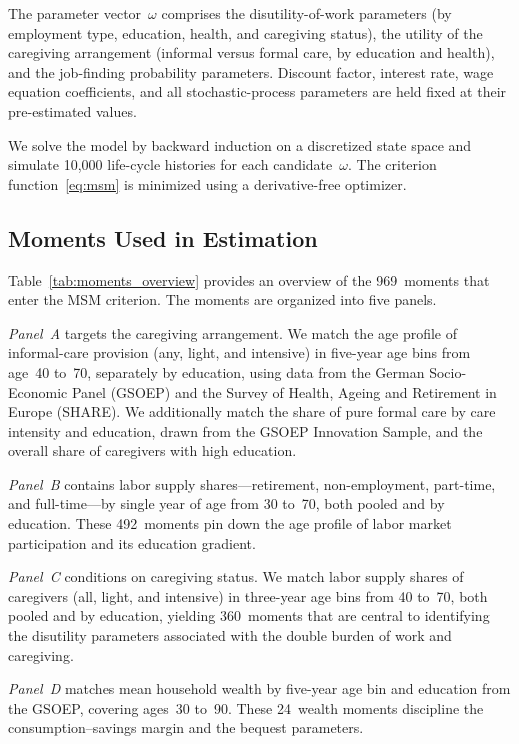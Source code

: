 The parameter vector~$\omega$ comprises the disutility-of-work parameters
(by employment type, education, health, and caregiving status), the utility
of the caregiving arrangement (informal versus formal care, by education
and health), and the job-finding probability parameters.  Discount factor,
interest rate, wage equation coefficients, and all stochastic-process
parameters are held fixed at their pre-estimated values.

We solve the model by backward induction on a discretized state space and
simulate 10{,}000 life-cycle histories for each candidate~$\omega$.  The
criterion function~\eqref{eq:msm} is minimized using a derivative-free
optimizer.


\subsection{Moments Used in Estimation}
\label{sec:moments}

Table~\ref{tab:moments_overview} provides an overview of the 969~moments
that enter the MSM criterion.  The moments are organized into five panels.

\textit{Panel~A} targets the caregiving arrangement.  We match the age
profile of informal-care provision (any, light, and intensive) in five-year
age bins from age~40 to~70, separately by education, using data from the
German Socio-Economic Panel (GSOEP) and the Survey of Health, Ageing and
Retirement in Europe (SHARE).  We additionally match the share of pure
formal care by care intensity and education, drawn from the GSOEP Innovation
Sample, and the overall share of caregivers with high education.

\textit{Panel~B} contains labor supply shares---retirement, non-employment,
part-time, and full-time---by single year of age from 30 to~70, both pooled
and by education.  These 492~moments pin down the age profile of labor
market participation and its education gradient.

\textit{Panel~C} conditions on caregiving status.  We match labor supply
shares of caregivers (all, light, and intensive) in three-year age bins from
40 to~70, both pooled and by education, yielding 360~moments that are
central to identifying the disutility parameters associated with the double
burden of work and caregiving.

\textit{Panel~D} matches mean household wealth by five-year age bin and
education from the GSOEP, covering ages~30 to~90.  These 24~wealth moments
discipline the consumption--savings margin and the bequest parameters.

